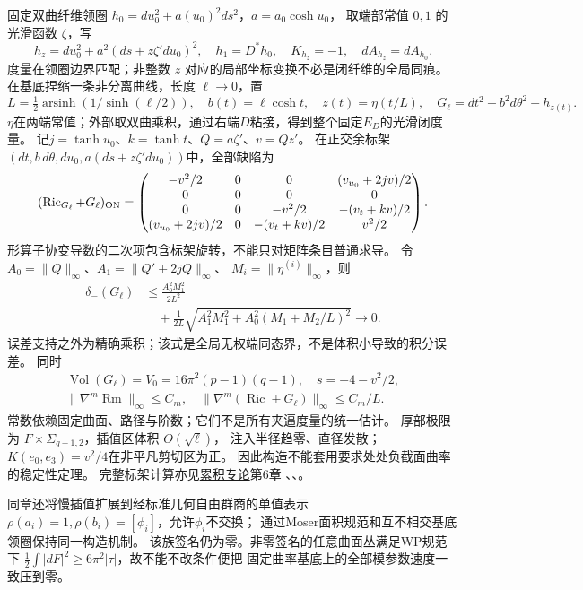 \documentclass[UTF8,a4paper,11pt,fontset=fandol]{ctexart}
\numberwithin{equation}{section}
\theoremstyle{definition}
\newcommand{\Ric}{\operatorname{Ric}}
\newcommand{\Rm}{\operatorname{Rm}}
\newcommand{\Vol}{\operatorname{Vol}}
\begin{document}
固定双曲纤维领圈
$h_0=du_0^2+a(u_0)^2ds^2$，$a=a_0\cosh u_0$，
取端部常值 $0,1$ 的光滑函数 $\zeta$，写
\[
 h_z=du_0^2+a^2(ds+z\zeta' du_0)^2,
 \quad h_1=D^*h_0,
 \quad K_{h_z}=-1,
 \quad dA_{h_z}=dA_{h_0}.
\]
度量在领圈边界匹配；非整数 $z$ 对应的局部坐标变换不必是闭纤维的全局同痕。
在基底捏缩一条非分离曲线，长度 $\ell\to0$，置
\[
 L=\tfrac12\operatorname{arsinh}(1/\sinh(\ell/2)),\quad
 b(t)=\ell\cosh t,\quad z(t)=\eta(t/L),\quad
 G_\ell=dt^2+b^2d\theta^2+h_{z(t)}.
\]
$\eta$在两端常值；外部取双曲乘积，通过右端$D$粘接，得到整个固定$E_D$的光滑闭度量。
记$j=\tanh u_0$、$k=\tanh t$、$Q=a\zeta'$、$v=Qz'$。
在正交余标架$(dt,b\,d\theta,du_0,a(ds+z\zeta'du_0))$中，全部缺陷为
\begin{equation}\label{eq:bundleRicci}
 (\Ric_{G_\ell}+G_\ell)_{\rm ON}=
 \begin{pmatrix}
 -v^2/2&0&0&(v_{u_0}+2jv)/2\\
 0&0&0&0\\
 0&0&-v^2/2&-(v_t+kv)/2\\
 (v_{u_0}+2jv)/2&0&-(v_t+kv)/2&v^2/2
 \end{pmatrix}.
\end{equation}
形算子协变导数的二次项包含标架旋转，不能只对矩阵条目普通求导。
令 $A_0=\|Q\|_\infty$、$A_1=\|Q'+2jQ\|_\infty$、
$M_i=\|\eta^{(i)}\|_\infty$，则
\begin{equation}\label{eq:bundlebound}
 \begin{aligned}
 \delta_-(G_\ell)&\le\frac{A_0^2M_1^2}{2L^2}\\
 &\quad+\frac1{2L}\sqrt{A_1^2M_1^2+A_0^2(M_1+M_2/L)^2}\longrightarrow0.
 \end{aligned}
\end{equation}
误差支持之外为精确乘积；该式是全局无权端同态界，不是体积小导致的积分误差。
同时
\[
 \begin{gathered}
 \Vol(G_\ell)=V_0=16\pi^2(p-1)(q-1),\quad
 s=-4-v^2/2,\\
 \|\nabla^m\Rm\|_\infty\le C_m,\quad
 \|\nabla^m(\Ric+G_\ell)\|_\infty\le C_m/L.
 \end{gathered}
\]
常数依赖固定曲面、路径与阶数；它们不是所有夹逼度量的统一估计。
厚部极限为 $F\times\Sigma_{q-1,2}$，插值区体积 $O(\sqrt\ell)$，
注入半径趋零、直径发散；$K(e_0,e_3)=v^2/4$在非平凡剪切区为正。
因此构造不能套用要求处处负截面曲率的稳定性定理。
完整标架计算亦见\href{20260912.tex}{累积专论}第6章
、、。

同章还将慢插值扩展到经标准几何自由群商的单值表示
$\rho(a_i)=1,\rho(b_i)=[\phi_i]$，允许$\phi_i$不交换；
通过Moser面积规范和互不相交基底领圈保持同一构造机制。
该族签名仍为零。非零签名的任意曲面丛满足WP规范下
$\frac12\int|dF|^2\ge6\pi^2|\tau|$，故不能不改条件便把
固定曲率基底上的全部模参数速度一致压到零。
\end{document}
